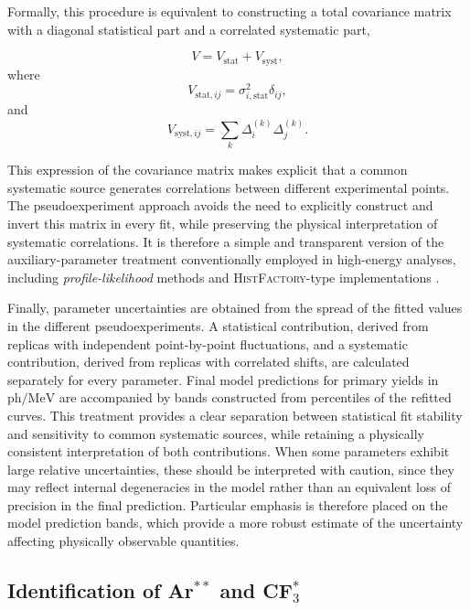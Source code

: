 \documentclass[12pt,a4paper]{article}
\begin{document}
Formally, this procedure is equivalent to constructing a total covariance matrix with a diagonal statistical part and a correlated systematic part,

\begin{equation*}
V
=
V_{\mathrm{stat}}
+
V_{\mathrm{syst}},
\end{equation*}
where
\begin{equation*}
V_{\mathrm{stat},ij}
=
\sigma_{i,\mathrm{stat}}^2\delta_{ij},
\end{equation*}
and
\begin{equation*}
V_{\mathrm{syst},ij}
=\sum_k
\Delta_i^{(k)}\Delta_j^{(k)}.
\end{equation*}

This expression of the covariance matrix makes explicit that a common systematic source generates correlations between different experimental points. The pseudoexperiment approach avoids the need to explicitly construct and invert this matrix in every fit, while preserving the physical interpretation of systematic correlations. It is therefore a simple and transparent version of the auxiliary-parameter treatment conventionally employed in high-energy analyses, including \textit{profile-likelihood} methods and \textsc{HistFactory}-type implementations \cite{Cowan2011,Cranmer2012HistFactory}.

Finally, parameter uncertainties are obtained from the spread of the fitted values in the different pseudoexperiments. A statistical contribution, derived from replicas with independent point-by-point fluctuations, and a systematic contribution, derived from replicas with correlated shifts, are calculated separately for every parameter. Final model predictions for primary yields in $\mathrm{ph/MeV}$ are accompanied by bands constructed from percentiles of the refitted curves. This treatment provides a clear separation between statistical fit stability and sensitivity to common systematic sources, while retaining a physically consistent interpretation of both contributions. When some parameters exhibit large relative uncertainties, these should be interpreted with caution, since they may reflect internal degeneracies in the model rather than an equivalent loss of precision in the final prediction. Particular emphasis is therefore placed on the model prediction bands, which provide a more robust estimate of the uncertainty affecting physically observable quantities.

\subsection{Identification of Ar$^{**}$ and CF$_3^*$}
\end{document}
